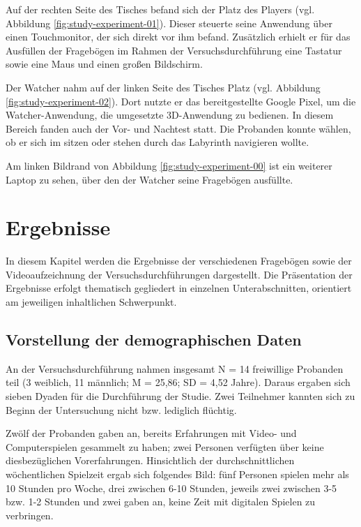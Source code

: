 Auf der rechten Seite des Tisches befand sich der Platz des Players (vgl. Abbildung \ref{fig:study-experiment-01}). Dieser steuerte seine Anwendung über einen Touchmonitor, der sich direkt vor ihm befand. Zusätzlich erhielt er für das Ausfüllen der Fragebögen im Rahmen der Versuchsdurchführung eine Tastatur sowie eine Maus und einen großen Bildschirm.

Der Watcher nahm auf der linken Seite des Tisches Platz (vgl. Abbildung \ref{fig:study-experiment-02}). Dort nutzte er das bereitgestellte Google Pixel, um die Watcher-Anwendung, die umgesetzte \ac{3D}-Anwendung zu bedienen. In diesem Bereich fanden auch der Vor- und Nachtest statt. Die Probanden konnte wählen, ob er sich im sitzen oder stehen durch das Labyrinth navigieren wollte.


Am linken Bildrand von Abbildung \ref{fig:study-experiment-00} ist ein weiterer Laptop zu sehen, über den der Watcher seine Fragebögen ausfüllte.

\section{Ergebnisse}

In diesem Kapitel werden die Ergebnisse der verschiedenen Fragebögen sowie der Videoaufzeichnung der Versuchsdurchführungen dargestellt. Die Präsentation der Ergebnisse erfolgt thematisch gegliedert in einzelnen Unterabschnitten, orientiert am jeweiligen inhaltlichen Schwerpunkt.

\subsection{Vorstellung der demographischen Daten}

An der Versuchsdurchführung nahmen insgesamt N = 14 freiwillige Probanden teil (3 weiblich, 11 männlich; M = 25,86; SD = 4,52 Jahre). Daraus ergaben sich sieben Dyaden für die Durchführung der Studie. Zwei Teilnehmer kannten sich zu Beginn der Untersuchung nicht bzw. lediglich flüchtig. 

Zwölf der Probanden gaben an, bereits Erfahrungen mit Video- und Computerspielen gesammelt zu haben; zwei Personen verfügten über keine diesbezüglichen Vorerfahrungen. Hinsichtlich der durchschnittlichen wöchentlichen Spielzeit ergab sich folgendes Bild: fünf Personen spielen mehr als 10 Stunden pro Woche, drei zwischen 6-10 Stunden, 
jeweils zwei zwischen 3-5 bzw. 1-2 Stunden und zwei gaben an, keine Zeit mit digitalen Spielen zu verbringen.


